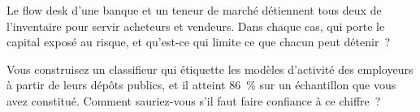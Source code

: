 \begin{interviewq}\label{iq:in:a-map-of-the-industry:5}
Le flow desk d'une banque et un teneur de marché détiennent tous deux de l'inventaire pour servir acheteurs et vendeurs. Dans chaque
cas, qui porte le capital exposé au risque, et qu'est-ce qui limite ce que chacun peut détenir~?
\end{interviewq}

\begin{interviewq}\label{iq:in:a-map-of-the-industry:6}
Vous construisez un classifieur qui étiquette les modèles d'activité des employeurs à partir de leurs dépôts publics, et il atteint
86~\% sur un échantillon que vous avez constitué. Comment sauriez-vous s'il faut faire confiance à ce chiffre~?
\end{interviewq}
